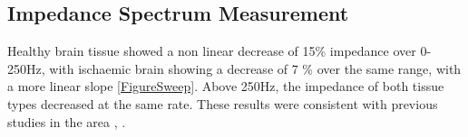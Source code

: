 \subsection{Impedance Spectrum Measurement}

Healthy brain tissue showed a non linear decrease of 15\% impedance over 0-250Hz, with ischaemic brain showing a decrease of 7 \% over the same range, with a more linear slope \ref{FigureSweep}. Above 250Hz, the impedance of both tissue types decreased at the same rate. These results were consistent with previous studies in the area \cite{Ranck_1963}, \cite{Logothetis_2007}.